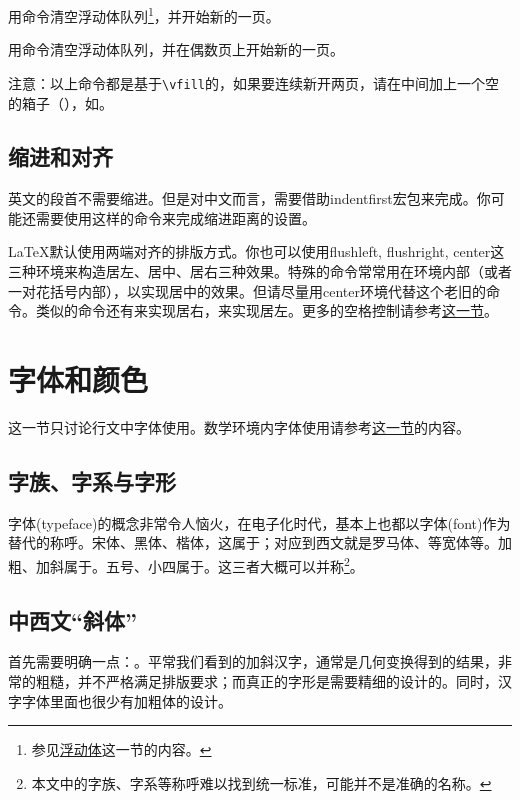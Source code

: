 {用\latexline{\\clearpage}命令清空浮动体队列\footnote{参见\hyperref[sec:float]{浮动体}这一节的内容。}，并开始新的一页。

用\latexline{\\cleardoublepage}命令清空浮动体队列，并在偶数页上开始新的一页。

注意：以上命令都是基于\verb|\vfill|的，如果要连续新开两页，请在中间加上一个空的箱子（\latexline{\\mbox{}}），如\latexline{\\newpage\\mbox{}\\newpage}。

\subsection{缩进和对齐}
英文的段首不需要缩进。但是对中文而言，需要借助indentfirst宏包来完成。你可能还需要使用\latexline{\\setlength{\\indent}{2em}}这样的命令来完成缩进距离的设置。

\LaTeX 默认使用两端对齐的排版方式。你也可以使用flushleft, flushright, center这三种环境来构造居左、居中、居右三种效果。特殊的\latexline{\\centering}命令常常用在环境内部（或者一对花括号内部），以实现居中的效果。但请尽量用center环境代替这个老旧的命令。类似的命令还有\latexline{\\raggedleft}来实现居右，\latexline{\\raggedright}来实现居左。更多的空格控制请参考\hyperref[sec:hvspace]{这一节}。

\section{字体和颜色}
\label{sec:font}
这一节只讨论行文中字体使用。数学环境内字体使用请参考\hyperref[sec:mathfont]{这一节}的内容。

\subsection{字族、字系与字形}
字体(typeface)的概念非常令人恼火，在电子化时代，基本上也都以字体(font)作为替代的称呼。宋体、黑体、楷体，这属于；对应到西文就是罗马体、等宽体等。加粗、加斜属于。五号、小四属于。这三者大概可以并称\footnote{本文中的字族、字系等称呼难以找到统一标准，可能并不是准确的名称。}。

\subsection{中西文“斜体”}
首先需要明确一点：。平常我们看到的加斜汉字，通常是几何变换得到的结果，非常的粗糙，并不严格满足排版要求；而真正的字形是需要精细的设计的。同时，汉字字体里面也很少有加粗体的设计。

}
